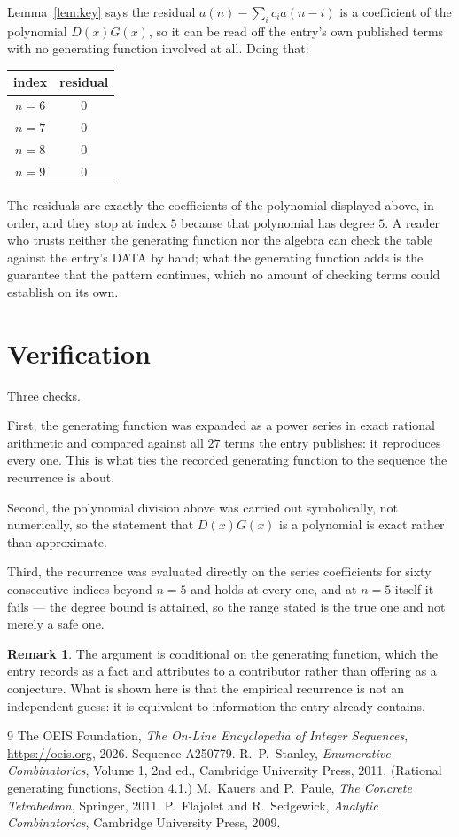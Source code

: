 \documentclass[11pt,a4paper]{article}
\theoremstyle{plain}
\theoremstyle{definition}
\newtheorem{remark}[theorem]{Remark}
\begin{document}
Lemma~\ref{lem:key} says the residual $a(n)-\sum_ic_ia(n-i)$ is a coefficient of the
polynomial $D(x)G(x)$, so it can be read off the entry's own published terms with no
generating function involved at all. Doing that:
\begin{center}
\begin{tabular}{cc}
index & residual \\ \hline
$n=6$ & $0$ \\
$n=7$ & $0$ \\
$n=8$ & $0$ \\
$n=9$ & $0$
\end{tabular}
\end{center}
The residuals are exactly the coefficients of the polynomial displayed above, in order, and
they stop at index $5$ because that polynomial has degree $5$. A reader who trusts
neither the generating function nor the algebra can check the table against the entry's DATA
by hand; what the generating function adds is the guarantee that the pattern continues, which
no amount of checking terms could establish on its own.

\section{Verification}

Three checks.

First, the generating function was expanded as a power series in exact rational arithmetic and
compared against all $27$ terms the entry publishes: it reproduces every one. This is
what ties the recorded generating function to the sequence the recurrence is about.

Second, the polynomial division above was carried out symbolically, not numerically, so the
statement that $D(x)G(x)$ is a polynomial is exact rather than approximate.

Third, the recurrence was evaluated directly on the series coefficients for sixty consecutive
indices beyond $n=5$ and holds at every one, and at $n=5$ itself it fails --- the
degree bound is attained, so the range stated is the true one and not merely a safe one.

\begin{remark}
The argument is conditional on the generating function, which the entry records as a fact and
attributes to a contributor rather than offering as a conjecture. What is shown here is that
the empirical recurrence is not an independent guess: it is equivalent to information the
entry already contains.
\end{remark}

\begin{thebibliography}{9}
 The OEIS Foundation, \emph{The On-Line Encyclopedia of Integer
Sequences}, \url{https://oeis.org}, 2026. Sequence A250779.
 R.~P.~Stanley, \emph{Enumerative Combinatorics}, Volume 1, 2nd ed.,
Cambridge University Press, 2011. (Rational generating functions, Section 4.1.)
 M.~Kauers and P.~Paule, \emph{The Concrete Tetrahedron}, Springer, 2011.
 P.~Flajolet and R.~Sedgewick, \emph{Analytic Combinatorics}, Cambridge
University Press, 2009.
\end{thebibliography}
\end{document}
